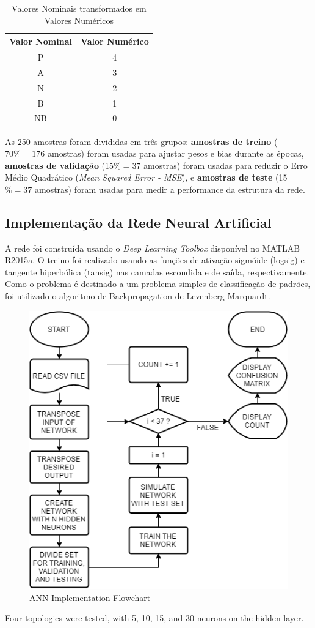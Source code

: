 \documentclass[12pt]{article}
\begin{document}
	\begin{table}[H]
	\centering
	\caption{Valores Nominais transformados em Valores Numéricos}
	\label{tab:exTable2}
	\begin{tabular}{cc}
	\hline
	Valor Nominal & Valor Numérico \\ \hline
	P             & 4               \\
	A             & 3               \\
	N             & 2               \\
	B             & 1               \\
	NB            & 0               \\ \hline
	\end{tabular}
	\end{table}
	As 250 amostras foram divididas em três grupos: \textbf{amostras de treino} ($70\% = 176$ amostras) foram usadas para ajustar pesos e bias durante as épocas, \textbf{amostras de validação} (15$\% = 37$ amostras) foram usadas para reduzir o Erro Médio Quadrático (\textit{Mean Squared Error - MSE}), e  \textbf{amostras de teste} (15$\% = 37$ amostras) foram usadas para medir a performance da estrutura da rede.

	\subsection{Implementação da Rede Neural Artificial}
	A rede foi construída usando o \textit{Deep Learning Toolbox} disponível no MATLAB R2015a. O treino foi realizado usando as funções de ativação sigmóide (logsig) e tangente hiperbólica (tansig) nas camadas escondida e de saída, respectivamente. Como o problema é destinado a um problema simples de classificação de padrões, foi utilizado o algoritmo de Backpropagation de Levenberg-Marquardt.
	\begin{figure}[H]
	\centering
	\includegraphics[width=.5\textwidth]{images/fig1.png}
	\caption{ANN Implementation Flowchart }
	\label{fig:exFig1}
	\end{figure}
	Four topologies were tested, with 5, 10, 15, and 30 neurons on the hidden layer.
\newpage
\end{document}
